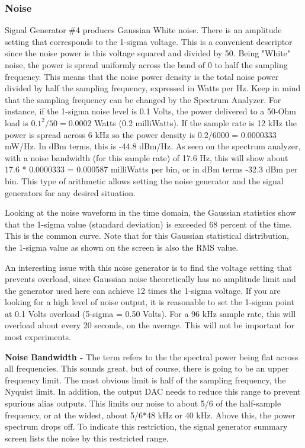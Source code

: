 \subsubsection{Noise}
\label{subsect:ASGNoise}
Signal  Generator \#4 produces Gaussian White noise.  There is an amplitude setting that corresponds to the 1-sigma voltage.  This is a convenient descriptor since the noise power is this voltage squared and divided by 50.  Being "White" noise, the power is spread uniformly across the band  of 0 to half the sampling frequency.  This means that the noise power density is the total noise power divided by half the sampling frequency,  expressed in Watts per Hz.  Keep in mind that the sampling frequency can be changed by the Spectrum Analyzer. For instance, if the 1-sigma noise level is 0.1 Volts, the power delivered to a 50-Ohm load is $0.1^2/50 = 0.0002$ Watts (0.2 milliWatts).   If the sample rate is 12 kHz the power is spread across 6 kHz so the power density is 0.2/6000 = 0.0000333 mW/Hz.  In dBm terms, this is -44.8 dBm/Hz.  As seen on the spectrum analyzer, with a noise bandwidth (for this sample rate) of 17.6 Hz, this will show about 17.6 * 0.0000333 = 0.000587 milliWatts per bin, or in dBm terms -32.3 dBm per bin.   This type of arithmetic allows setting the noise generator and the signal generators for any desired situation.

Looking at the noise waveform in the time domain,  the Gaussian statistics show that the 1-sigma value (standard deviation) is exceeded 68 percent of the time.  This is the common  curve.  Note that for this Gaussian statistical distribution, the 1-sigma value as shown on the screen is also the RMS value.

An interesting issue with this noise generator is to find the voltage setting that prevents overload, since Gaussian noise theoretically has no amplitude limit and the generator used here can achieve 12 times the 1-sigma voltage.  If you are looking for a high level of noise output, it is reasonable to set the 1-sigma point at 0.1 Volts overload (5-sigma = 0.50 Volts). For a 96 kHz sample rate, this will overload about every 20 seconds, on the average.  This will not be important for most experiments.

\textbf{Noise Bandwidth - }The term  refers to the the spectral power being flat across all frequencies.   This sounds great, but of course, there is going to be an upper frequency limit.  The most obvious limit is half of the sampling frequency, the Nyquist limit.  In addition, the output DAC needs to reduce this range to prevent spurious alias outputs.  This limits our noise to about 5/6 of the half-sample frequency, or at the widest, about 5/6*48 kHz or 40 kHz.  Above this, the power spectrum drops off.  To indicate this restriction, the signal generator summary screen lists the noise by this restricted range.
